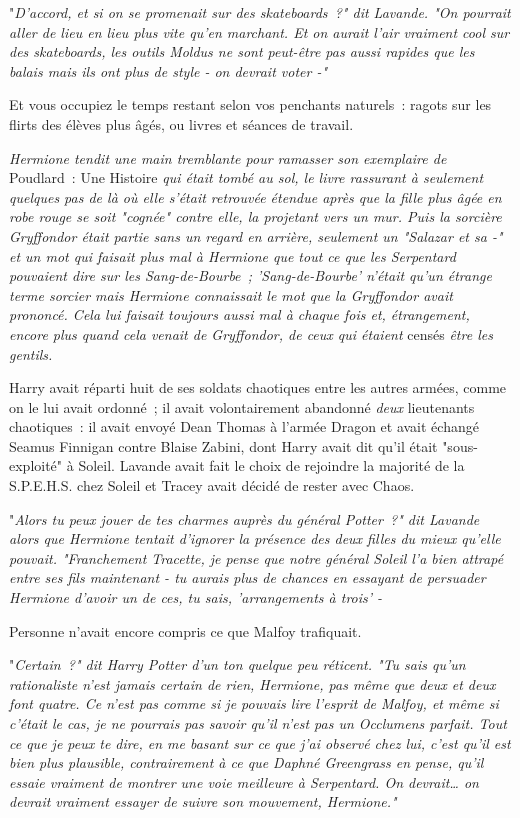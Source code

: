"\emph{D'accord, et si on se promenait sur des skateboards~?" dit Lavande. "On pourrait aller de lieu en lieu plus vite qu'en marchant. Et on aurait l'air vraiment cool sur des skateboards, les outils Moldus ne sont peut-être pas aussi rapides que les balais mais ils ont plus de style - on devrait voter -"}

Et vous occupiez le temps restant selon vos penchants naturels~: ragots sur les flirts des élèves plus âgés, ou livres et séances de travail.

\emph{Hermione tendit une main tremblante pour ramasser son exemplaire de} Poudlard~: Une Histoire \emph{qui était tombé au sol, le livre rassurant à seulement quelques pas de là où elle s'était retrouvée étendue après que la fille plus âgée en robe rouge se soit "cognée" contre elle, la projetant vers un mur. Puis la sorcière Gryffondor était partie sans un regard en arrière, seulement un "Salazar et sa -" et un mot qui faisait plus mal à Hermione que tout ce que les Serpentard pouvaient dire sur les Sang-de-Bourbe~; 'Sang-de-Bourbe' n'était qu'un étrange terme sorcier mais Hermione connaissait le mot que la Gryffondor avait prononcé. Cela lui faisait toujours aussi mal à chaque fois et, étrangement, encore plus quand cela venait de Gryffondor, de ceux qui étaient} censés \emph{être les gentils.}

Harry avait réparti huit de ses soldats chaotiques entre les autres armées, comme on le lui avait ordonné~; il avait volontairement abandonné \emph{deux} lieutenants chaotiques~: il avait envoyé Dean Thomas à l'armée Dragon et avait échangé Seamus Finnigan contre Blaise Zabini, dont Harry avait dit qu'il était "sous-exploité" à Soleil. Lavande avait fait le choix de rejoindre la majorité de la S.P.E.H.S. chez Soleil et Tracey avait décidé de rester avec Chaos.

"\emph{Alors tu peux jouer de tes charmes auprès du général Potter~?" dit Lavande alors que Hermione tentait d'ignorer la présence des deux filles du mieux qu'elle pouvait. "Franchement Tracette, je pense que notre général Soleil l'a bien attrapé entre ses fils maintenant - tu aurais plus de chances en essayant de persuader Hermione d'avoir un de ces, tu sais, 'arrangements à trois' -}

Personne n'avait encore compris ce que Malfoy trafiquait.

"\emph{Certain~?" dit Harry Potter d'un ton quelque peu réticent. "Tu sais qu'un rationaliste n'est jamais certain de rien, Hermione, pas même que deux et deux font quatre. Ce n'est pas comme si je pouvais lire l'esprit de Malfoy, et même si c'était le cas, je ne pourrais pas savoir qu'il n'est pas un Occlumens parfait. Tout ce que je peux te dire, en me basant sur ce que j'ai observé chez lui, c'est qu'il est bien plus plausible, contrairement à ce que Daphné Greengrass en pense, qu'il essaie vraiment de montrer une voie meilleure à Serpentard. On devrait… on devrait vraiment essayer de suivre son mouvement, Hermione."}

